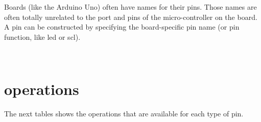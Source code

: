\begin{DoxyCodeInclude}
\end{DoxyCodeInclude}
 Boards (like the Arduino Uno) often have names for their pins. Those names are often totally unrelated to the port and pins of the micro-\/controller on the board. A pin can be constructed by specifying the board-\/specific pin name (or pin function, like \textquotesingle{}led\textquotesingle{} or \textquotesingle{}scl\textquotesingle{}).


\begin{DoxyCodeInclude}
\end{DoxyCodeInclude}
 ~\newline
 

\hypertarget{pins_pin-operation}{}\section{operations}\label{pins_pin-operation}
The next tables shows the operations that are available for each type of pin.

